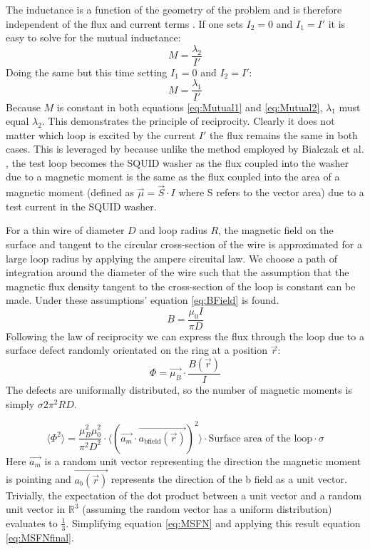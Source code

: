 The inductance is a function of the geometry of the problem and is therefore independent of the flux and current terms \cite{Feynman_Leighton_Sands_2013}. If one sets $I_2 = 0$ and $I_1 = I'$ it is easy to solve for the mutual inductance: 
\begin{equation}
    M = \frac{\lambda_2}{I'}
    \label{eq:Mutual2}
\end{equation} 
Doing the same but this time setting $I_1 = 0$ and $I_2 = I'$:
\begin{equation}
    M = \frac{\lambda_1}{I'}
    \label{eq:Mutual1}
\end{equation}
Because $M$ is constant in both equations \ref{eq:Mutual1} and \ref{eq:Mutual2}, $\lambda_1$ must equal $\lambda_2$. This demonstrates the principle of reciprocity. Clearly it does not matter which loop is excited by the current $I'$ the flux remains the same in both cases. This is leveraged by \cite{KochModel} because unlike the method employed by Bialczak et al. \cite{BialczakTestLoop}, the test loop becomes the SQUID washer as the flux coupled into the washer due to a magnetic moment is the same as the flux coupled into the area of a magnetic moment (defined as $\Vec{\mu} = \Vec{S}\cdot I$ where S refers to the vector area) due to a test current in the SQUID washer. \par
For a thin wire of diameter $D$ and loop radius $R$, the magnetic field on the surface and tangent to the circular cross-section of the wire is approximated for a large loop radius by applying the ampere circuital law. We choose a path of integration around the diameter of the wire such that the assumption that the magnetic flux density tangent to the cross-section of the loop is constant can be made. Under these assumptions' equation \ref{eq:BField} is found.
\begin{equation}
    B = \frac{\mu_0I}{\pi D}
    \label{eq:BField}
\end{equation}
Following the law of reciprocity we can express the flux through the loop due to a surface defect randomly orientated on the ring at a position $\Vec{r}$:
\begin{equation}
    \Phi = \Vec{\mu_B}\cdot \frac{B(\Vec{r})}{I} 
    \label{eq:Flux}
\end{equation}
The defects are uniformally distributed, so the number of magnetic moments is simply $\sigma 2\pi^2RD$.

\begin{equation}
    \langle \Phi^2 \rangle = \frac{\mu_B^2 \mu_0^2}{\pi^2 D^2}\cdot\langle (\Vec{a_m}\cdot \Vec{a_\text{bfield}(\Vec{r})})^2\rangle \cdot \text{Surface area of the loop} \cdot \sigma
    \label{eq:MSFN}
\end{equation}
Here $\Vec{a_m}$ is a random unit vector representing the direction the magnetic moment is pointing and $\Vec{a_b(\Vec{r})}$ represents the direction of the b field as a unit vector. Trivially, the expectation of the dot product between a unit vector and a random unit vector in $\mathbb{R}^3$ (assuming the random vector has a uniform distribution) evaluates to $\frac{1}{3}$. Simplifying equation \ref{eq:MSFN} and applying this result equation \ref{eq:MSFNfinal}.

